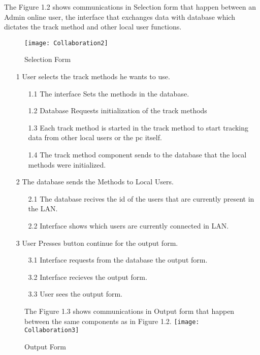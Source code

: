 The Figure 1.2 shows communications in Selection form that happen between an Admin online user, the interface that exchanges data with database which dictates the track method and other local user functions.
\begin{figure}[h!]
	\centering
\texttt{[image: Collaboration2]}
	\caption{Selection Form} 
\end{figure}
\begin{flushleft}
\begin{enumerate}
   \item[1] User selects the track methods he wants to use.
   \begin{itemize}
     \item[1.1] The interface Sets the methods in the database.
     \item[1.2] Database Requests initialization of the track methods
     \item[1.3] Each track method is started in the track method to start tracking data from other local users or the pc itself.
     \item[1.4] The track method component sends to the database that the local methods were initialized.
   \end{itemize}
   \item[2] The database sends the Methods to Local Users.
   \begin{itemize}
     \item[2.1] The database recives the id of the users that are currently present in the LAN. 
     \item[2.2] Interface shows which users are currently connected in LAN.
   \end{itemize}
   \item[3] User Presses button continue for the output form.
   \begin{itemize}
     \item[3.1] Interface requests from the database the output form.
     \item[3.2] Interface recieves the output form.
     \item[3.3]  User sees the output form.
   \end{itemize}
\end{enumerate}
\end{flushleft}
\begin{figure}[h!]
	\centering

The Figure 1.3 shows communications in Output form that happen between the same components as in Figure 1.2.	\texttt{[image: Collaboration3]}
	\caption{Output Form} 
\end{figure}
